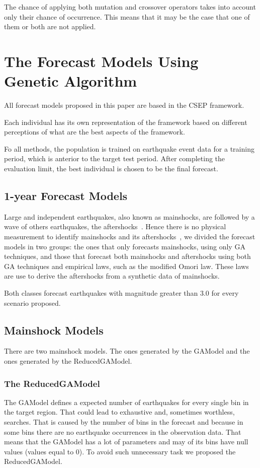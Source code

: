 The chance of applying both mutation and crossover operators takes into account only their chance of occurrence. This means that it may be the case that one of them or both are not applied.

\section{The Forecast Models Using Genetic Algorithm}\label{Models}

All forecast models proposed in this paper are based in the
CSEP framework.

Each individual has its own representation of the framework based on
different perceptions of what are the best aspects of the framework.

Fo all methods, the population is trained on earthquake event data for a training
period, which is anterior to the target test period. After completing
the evaluation limit, the best individual is chosen to be the final
forecast.

\subsection{1-year Forecast Models}
Large and independent earthquakes, also known as mainshocks, are
followed by a wave of others earthquakes, the
aftershocks~\cite{schorlemmer2010first}. Hence there is no physical
measurement to identify mainshocks and its
aftershocks~\cite{schorlemmer2010first}, we divided the forecast
models in two groups: the ones that only forecasts mainshocks, using only GA techniques, and those that forecast both mainshocks and aftershocks using both GA techniques and empirical laws, such as the modified Omori law. These laws are use to derive the aftershocks from a synthetic data of mainshocks. 

Both classes forecast earthquakes with magnitude greater than 3.0 for
every scenario proposed.%


\subsection{Mainshock Models}\label{mainshocksMethods}
There are two mainshock models. The ones generated by the GAModel and the ones generated by the ReducedGAModel.

\subsubsection{The ReducedGAModel}\label{ReducedGAModel}
The GAModel defines a expected number of earthquakes for every single bin in the target region. That could lead to exhaustive and, sometimes worthless, searches. That is caused by the number of bins in the forecast and because in some bins there are no earthquake occurrences in the observation data. That means that the GAModel has a lot of parameters and may of its bins have null values (values equal to 0). To avoid such unnecessary task we proposed the ReducedGAModel.

